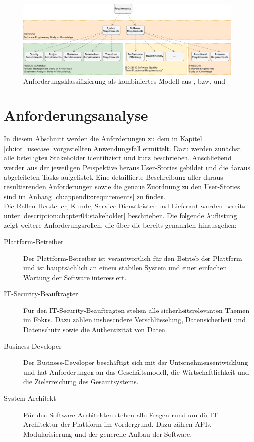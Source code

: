 \begin{figure}[htbp]
 \centering
 \includegraphics[width=1.0\textwidth]{gfx/Requirements_Hierarchy.png}
 \caption{Anforderungsklassifizierung als kombiniertes Modell aus \cite{SWEBOK}, \cite{PMBOK} bzw. \cite{BABOK} und \cite{ISO25010}}
 \label{fig:chapter05:requirements_hierarchy}
\end{figure}

%
%
\section{Anforderungsanalyse}
\label{sec:requirements:analysis}
In diesem Abschnitt werden die Anforderungen zu dem in Kapitel \ref{ch:iot_usecase} vorgestellten Anwendungsfall ermittelt. Dazu werden zunächst alle beteiligten Stakeholder identifiziert und kurz beschrieben. Anschließend werden aus der jeweiligen Perspektive heraus User-Stories gebildet und die daraus abgeleiteten Tasks aufgelistet. Eine detaillierte Beschreibung aller daraus resultierenden Anforderungen sowie die genaue Zuordnung zu den User-Stories sind im Anhang \ref{ch:appendix:requirements} zu finden.\\

Die Rollen Hersteller, Kunde, Service-Dienstleister und Lieferant wurden bereits unter \ref{description:chapter04:stakeholder} beschrieben. Die folgende Auflistung zeigt weitere Anforderungsrollen, die über die bereits genannten hinausgehen:
\begin{description}
  \item[Plattform-Betreiber] Der Plattform-Betreiber ist verantwortlich für den Betrieb der Plattform und ist hauptsächlich an einem stabilen System und einer einfachen Wartung der Software interessiert.
  \item[IT-Security-Beauftragter] Für den IT-Security-Beauftragten stehen alle sicherheitsrelevanten Themen im Fokus. Dazu zählen insbesondere Verschlüsselung, Datensicherheit und Datenschutz sowie die Authentizität von Daten.
  \item[Business-Developer] Der Business-Developer beschäftigt sich mit der Unternehmensentwicklung und hat Anforderungen an das Geschäftsmodell, die Wirtschaftlichkeit und die Zielerreichung des Gesamtsystems.
  \item[System-Architekt] Für den Software-Architekten stehen alle Fragen rund um die IT-Architektur der Plattform im Vordergrund. Dazu zählen \acp{API}, Modularisierung und der generelle Aufbau der Software.
\end{description}

